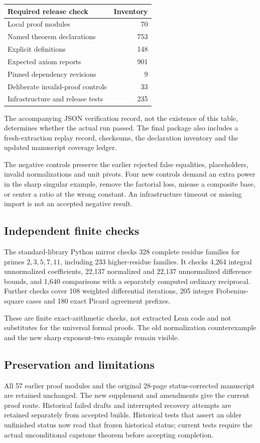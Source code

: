 \documentclass[11pt]{article}
\begin{document}
\begin{center}\begin{tabular}{lr}\toprule
Required release check & Inventory\\\midrule
Local proof modules &70\\
Named theorem declarations &753\\
Explicit definitions &148\\
Expected axiom reports &901\\
Pinned dependency revisions &9\\
Deliberate invalid-proof controls &33\\
Infrastructure and release tests &235\\\bottomrule
\end{tabular}\end{center}
The accompanying JSON verification record, not the existence of this table, determines whether the actual run passed. The final package also includes a fresh-extraction replay record, checksums, the declaration inventory and the updated manuscript coverage ledger.

The negative controls preserve the earlier rejected false equalities, placeholders, invalid normalizations and unit pivots. Four new controls demand an extra power in the sharp singular example, remove the factorial loss, misuse a composite base, or center a ratio at the wrong constant. An infrastructure timeout or missing import is not an accepted negative result.

\subsection*{Independent finite checks}
The standard-library Python mirror checks 328 complete residue families for primes $2,3,5,7,11$, including 233 higher-residue families. It checks 4,264 integral unnormalized coefficients, 22,137 normalized and 22,137 unnormalized difference bounds, and 1,640 comparisons with a separately computed ordinary reciprocal. Further checks cover 108 weighted differential iterations, 205 integer Frobenius-square cases and 180 exact Picard agreement prefixes.

These are finite exact-arithmetic checks, not extracted Lean code and not substitutes for the universal formal proofs. The old normalization counterexample and the new sharp exponent-two example remain visible.

\subsection*{Preservation and limitations}
All 57 earlier proof modules and the original 28-page status-corrected manuscript are retained unchanged. The new supplement and amendments give the current proof route. Historical failed drafts and interrupted recovery attempts are retained separately from accepted builds. Historical tests that assert an older unfinished status now read that frozen historical status; current tests require the actual unconditional capstone theorem before accepting completion.
\end{document}
